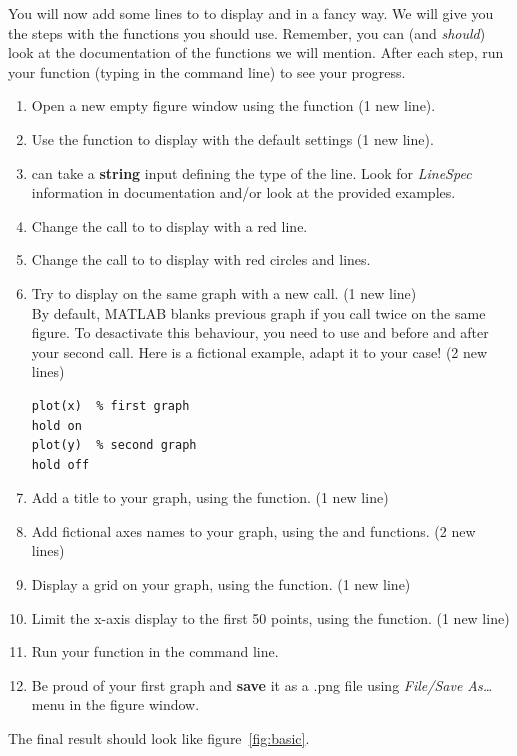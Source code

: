 \documentclass{article}
\begin{document}
You will now add some lines to  to display  and  in a fancy way.
We will give you the steps with the functions you should use.
Remember, you can (and \emph{should}) look at the documentation of the functions we will mention.
After each step, run your function (typing  in the command line) to see your progress.
\begin{enumerate}
  \item Open a new empty figure window using the  function (1 new line).
  \item Use the  function to display  with the default settings (1 new line).
  \item {} can take a \textbf{string} input defining the type of the line.
    Look for \emph{LineSpec} information in  documentation and/or look at the provided examples.
  \item Change the call to  to display  with a red line.
  \item Change the call to  to display  with red circles and lines.
  \item Try to display  on the same graph with a new  call. (1 new line)\\
    By default, MATLAB blanks previous graph if you call  twice on the same figure.
    To desactivate this behaviour, you need to use  and  before and after
    your second  call.
    Here is a fictional example, adapt it to your case! (2 new lines)
\begin{lstlisting}
plot(x)  % first graph
hold on
plot(y)  % second graph
hold off
\end{lstlisting}
  \item Add a title to your graph, using the  function. (1 new line)
  \item Add fictional axes names to your graph, using the  and  functions. (2 new lines)
  \item Display a grid on your graph, using the  function. (1 new line)
  \item Limit the x-axis display to the first 50 points, using the  function. (1 new line)
  \item Run your function in the command line.
  \item Be proud of your first graph and \textbf{save} it as a .png file using \emph{File/Save As\dots} menu in the figure window.
\end{enumerate}
The final result should look like figure~\ref{fig:basic}.
\end{document}

